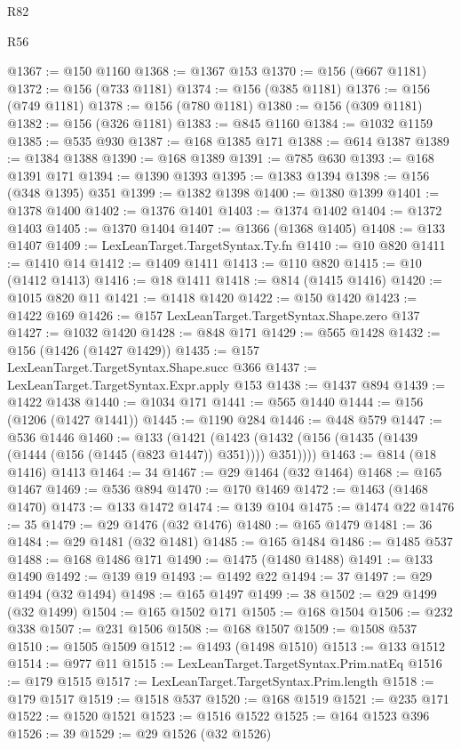 \begin{lexlean}{R82}
\begin{lexlean}{R56}
\begin{coremodule}
{{{{{{{{{{{{{{{{{{{{{{{{{{{{{{{{{{{{{{{{{{{{{{{{{{{{{{{{{{{{{{{{{{{{{{{{{{{{{{{{{{{{{{{{{{{{{{{{{{{{{{{{{{{{{{{{{{{{{{{{{{{{{{{{{{{{{{{{{{{{{{{{{{{{{{{{{{{{{{{{{{{{{{{{{{{{{{{{{{{{{{{{{{{{{{{{{{{{{{{{{{{{{{{{{{{@1367 := @150 @1160
@1368 := @1367 @153
@1370 := @156 (@667 @1181)
@1372 := @156 (@733 @1181)
@1374 := @156 (@385 @1181)
@1376 := @156 (@749 @1181)
@1378 := @156 (@780 @1181)
@1380 := @156 (@309 @1181)
@1382 := @156 (@326 @1181)
@1383 := @845 @1160
@1384 := @1032 @1159
@1385 := @535 @930
@1387 := @168 @1385 @171
@1388 := @614 @1387
@1389 := @1384 @1388
@1390 := @168 @1389
@1391 := @785 @630
@1393 := @168 @1391 @171
@1394 := @1390 @1393
@1395 := @1383 @1394
@1398 := @156 (@348 @1395) @351
@1399 := @1382 @1398
@1400 := @1380 @1399
@1401 := @1378 @1400
@1402 := @1376 @1401
@1403 := @1374 @1402
@1404 := @1372 @1403
@1405 := @1370 @1404
@1407 := @1366 (@1368 @1405)
@1408 := @133 @1407
@1409 := LexLeanTarget.TargetSyntax.Ty.fn
@1410 := @10 @820
@1411 := @1410 @14
@1412 := @1409 @1411
@1413 := @110 @820
@1415 := @10 (@1412 @1413)
@1416 := @18 @1411
@1418 := @814 (@1415 @1416)
@1420 := @1015 @820 @11
@1421 := @1418 @1420
@1422 := @150 @1420
@1423 := @1422 @169
@1426 := @157 LexLeanTarget.TargetSyntax.Shape.zero @137
@1427 := @1032 @1420
@1428 := @848 @171
@1429 := @565 @1428
@1432 := @156 (@1426 (@1427 @1429))
@1435 := @157 LexLeanTarget.TargetSyntax.Shape.succ @366
@1437 := LexLeanTarget.TargetSyntax.Expr.apply @153
@1438 := @1437 @894
@1439 := @1422 @1438
@1440 := @1034 @171
@1441 := @565 @1440
@1444 := @156 (@1206 (@1427 @1441))
@1445 := @1190 @284
@1446 := @448 @579
@1447 := @536 @1446
@1460 := @133
    (@1421 (@1423 (@1432 (@156 (@1435 (@1439 (@1444 (@156 (@1445 (@823 @1447)) @351)))) @351))))
@1463 := @814 (@18 @1416) @1413
@1464 := 34
@1467 := @29 @1464 (@32 @1464)
@1468 := @165 @1467
@1469 := @536 @894
@1470 := @170 @1469
@1472 := @1463 (@1468 @1470)
@1473 := @133 @1472
@1474 := @139 @104
@1475 := @1474 @22
@1476 := 35
@1479 := @29 @1476 (@32 @1476)
@1480 := @165 @1479
@1481 := 36
@1484 := @29 @1481 (@32 @1481)
@1485 := @165 @1484
@1486 := @1485 @537
@1488 := @168 @1486 @171
@1490 := @1475 (@1480 @1488)
@1491 := @133 @1490
@1492 := @139 @19
@1493 := @1492 @22
@1494 := 37
@1497 := @29 @1494 (@32 @1494)
@1498 := @165 @1497
@1499 := 38
@1502 := @29 @1499 (@32 @1499)
@1504 := @165 @1502 @171
@1505 := @168 @1504
@1506 := @232 @338
@1507 := @231 @1506
@1508 := @168 @1507
@1509 := @1508 @537
@1510 := @1505 @1509
@1512 := @1493 (@1498 @1510)
@1513 := @133 @1512
@1514 := @977 @11
@1515 := LexLeanTarget.TargetSyntax.Prim.natEq
@1516 := @179 @1515
@1517 := LexLeanTarget.TargetSyntax.Prim.length
@1518 := @179 @1517
@1519 := @1518 @537
@1520 := @168 @1519
@1521 := @235 @171
@1522 := @1520 @1521
@1523 := @1516 @1522
@1525 := @164 @1523 @396
@1526 := 39
@1529 := @29 @1526 (@32 @1526)
}}}}}}}}}}}}}}}}}}}}}}}}}}}}}}}}}}}}}}}}}}}}}}}}}}}}}}}}}}}}}}}}}}}}}}}}}}}}}}}}}}}}}}}}}}}}}}}}}}}}}}}}}}}}}}}}}}}}}}}}}}}}}}}}}}}}}}}}}}}}}}}}}}}}}}}}}}}}}}}}}}}}}}}}}}}}}}}}}}}}}}}}}}}}}}}}}}}}}}}}}}}}}}}}}}}
\end{coremodule}
\end{lexlean}
\end{lexlean}
